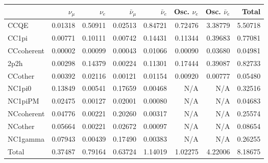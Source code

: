 \begin{tabular} { | l ||r | r | r | r | r | r | | r | }
\hline
              & $\nu_\mu$            & $\nu_e$              & $\bar{\nu}_{\mu}$    & $\bar{\nu}_{e}$      & Osc. $\nu_e$         & Osc. $\bar{\nu}_{e}$ & Total                \\ \hline\hline
 CCQE         & 0.01318              & 0.50911              & 0.02513              & 0.84721              & 0.72476              & 3.38779              & 5.50718              \\ \hline
 CC1pi        & 0.00771              & 0.10111              & 0.00742              & 0.14431              & 0.11344              & 0.39683              & 0.77081              \\ \hline
 CCcoherent   & 0.00002              & 0.00099              & 0.00043              & 0.01066              & 0.00090              & 0.03680              & 0.04981              \\ \hline
 2p2h         & 0.00298              & 0.14379              & 0.00224              & 0.11301              & 0.17444              & 0.39087              & 0.82733              \\ \hline
 CCother      & 0.00392              & 0.02116              & 0.00121              & 0.01154              & 0.00920              & 0.00777              & 0.05480              \\ \hline
 NC1pi0       & 0.13849              & 0.00541              & 0.17659              & 0.00468              & N/A                  & N/A                  & 0.32516              \\ \hline
 NC1piPM      & 0.02475              & 0.00127              & 0.02001              & 0.00080              & N/A                  & N/A                  & 0.04683              \\ \hline
 NCcoherent   & 0.04776              & 0.00221              & 0.20260              & 0.00317              & N/A                  & N/A                  & 0.25574              \\ \hline
 NCother      & 0.05664              & 0.00221              & 0.02672              & 0.00097              & N/A                  & N/A                  & 0.08654              \\ \hline
 NC1gamma     & 0.07943              & 0.00439              & 0.17490              & 0.00383              & N/A                  & N/A                  & 0.26255              \\ \hline
\hline
 Total        & 0.37487              & 0.79164              & 0.63724              & 1.14019              & 1.02275              & 4.22006              & 8.18675              \\ \hline

\end{tabular}
